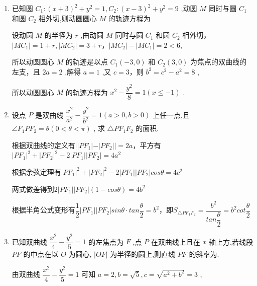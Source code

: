 \begin{enumerate}
\begin{jieda}
\begin{enumerate}
            因此,双曲线的标准方程为 $\dfrac{{y}^{2}}{4} - \dfrac{{x}^{2}}{3} = 1$ .
        \end{enumerate}
    \end{jieda}
    \item 已知圆 ${C}_{1} : {\left( x + 3\right) }^{2} + {y}^{2} = 1,{C}_{2} : {\left( x - 3\right) }^{2} + {y}^{2} = 9$ ,动圆 $M$ 同时与圆 ${C}_{1}$ 和圆 ${C}_{2}$ 相外切,则动圆圆心 $M$ 的轨迹方程为

    \begin{jieda}
        设动圆 $M$ 的半径为 $r$ ,由动圆 $M$ 同时与圆 ${C}_{1}$ 和圆 ${C}_{2}$ 相外切，$\left| {M{C}_{1}}\right|  = 1 + r,\left| {M{C}_{2}}\right|  = 3 + r$，$\left| {M{C}_{2}}\right|  - \left| {M{C}_{1}}\right|  = 2 < 6,$
        
        所以动圆圆心 $M$ 的轨迹是以点 ${C}_{1}\left( {-3,0}\right)$ 和 ${C}_{2}\left( {3,0}\right)$ 为焦点的双曲线的左支，且 ${2a} = 2$ ,解得 $a = 1$ ,又 $c = 3$，则 ${b}^{2} = {c}^{2} - {a}^{2} = 8$ ,
        
        所以动圆圆心 $M$ 的轨迹方程为 ${x}^{2} - \dfrac{{y}^{2}}{8} = 1\left( {x \leq   - 1}\right)$ .
    \end{jieda}
    

    \item 设点 $P$ 是双曲线 $\dfrac{{x}^{2}}{{a}^{2}} - \dfrac{{y}^{2}}{{b}^{2}} = 1\left( {a > 0,b > 0}\right)$ 上任一点,且 $\angle {F}_{1}P{F}_{2} = {\theta }\left( {0 < \theta  < \pi}\right)$ , 求 $\bigtriangleup P{F}_{1}{F}_{2}$ 的面积.
    \begin{jieda}
        根据双曲线的定义有$||PF_1| - |PF_2|| = 2a$，平方有$|PF_1|^2+|PF_2|^2-2|PF_1||PF_2| = 4a^2$

        根据余弦定理有$|PF_1|^2 + |PF_2|^2 - 2|PF_1||PF_2|cos\theta = 4c^2$

        两式做差得到$2|PF_1||PF_2|(1-cos\theta) = 4b^2$

        根据半角公式变形有$\dfrac{1}{2}|PF_1||PF_2|sin\theta \cdot tan\dfrac{\theta}{2} = b^2$，即$S_{\triangle PF_1F_2} = \dfrac{b^2}{tan\dfrac{\theta}{2}} = b^2cot\dfrac{\theta}{2}$
    \end{jieda}
      \item 已知双曲线 $\dfrac{{x}^{2}}{4} - \dfrac{{y}^{2}}{5} = 1$ 的左焦点为 $F$ ,点 $P$ 在双曲线上且在 $x$ 轴上方,若线段 ${PF}$ 的中点在以 $O$ 为圆心, $\left| {OF}\right|$ 为半径的圆上,则直线 ${PF}$ 的斜率为.
    \begin{jieda}
        由双曲线 $\dfrac{{x}^{2}}{4} - \dfrac{{y}^{2}}{5} = 1$ 可知 $a = 2,b = \sqrt{5},c = \sqrt{{a}^{2} + {b}^{2}} = 3$ ,
        

\end{jieda}
\end{enumerate}

